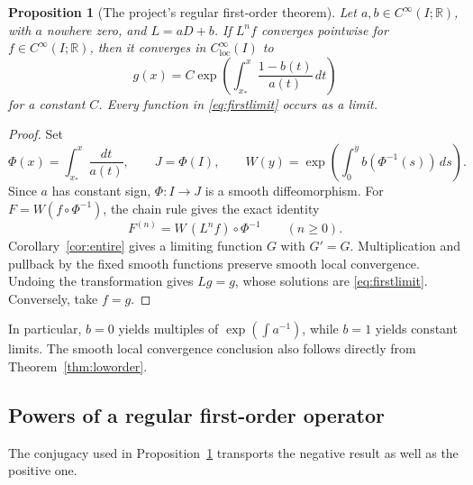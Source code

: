 \documentclass[11pt,reqno]{amsart}
\numberwithin{equation}{section}
\newtheorem{proposition}[theorem]{Proposition}
\theoremstyle{definition}
\theoremstyle{remark}
\newcommand{\R}{\mathbb R}
\newcommand{\loc}{\mathrm{loc}}
\newcommand{\clim}{C^\infty_{\loc}}
\begin{document}
\begin{proposition}[The project's regular first-order theorem]\label{prop:conjugacy}
Let $a,b\in C^\infty(I;\R)$, with $a$ nowhere zero, and $L=aD+b$. If $L^nf$ converges pointwise for $f\in C^\infty(I;\R)$, then it converges in $\clim(I)$ to
\begin{equation}\label{eq:firstlimit}
 g(x)=C\exp\left(\int_{x_*}^x\frac{1-b(t)}{a(t)}\,dt\right)
\end{equation}
for a constant $C$. Every function in \eqref{eq:firstlimit} occurs as a limit.
\end{proposition}
\begin{proof}
Set
\[
 \Phi(x)=\int_{x_*}^x\frac{dt}{a(t)},\qquad J=\Phi(I),\qquad
 W(y)=\exp\left(\int_0^y b(\Phi^{-1}(s))\,ds\right).
\]
Since $a$ has constant sign, $\Phi:I\to J$ is a smooth diffeomorphism. For $F=W(f\circ\Phi^{-1})$, the chain rule gives the exact identity
\begin{equation}\label{eq:firstconjugacy}
 F^{(n)}=W\,(L^nf)\circ\Phi^{-1}\qquad(n\ge0).
\end{equation}
Corollary~\ref{cor:entire} gives a limiting function $G$ with $G'=G$. Multiplication and pullback by the fixed smooth functions preserve smooth local convergence. Undoing the transformation gives $Lg=g$, whose solutions are \eqref{eq:firstlimit}. Conversely, take $f=g$.
\end{proof}
In particular, $b=0$ yields multiples of $\exp(\int a^{-1})$, while $b=1$ yields constant limits. The smooth local convergence conclusion also follows directly from Theorem~\ref{thm:loworder}.

\subsection{Powers of a regular first-order operator}
The conjugacy used in Proposition~\ref{prop:conjugacy} transports the negative result as well as the positive one.
\end{document}

